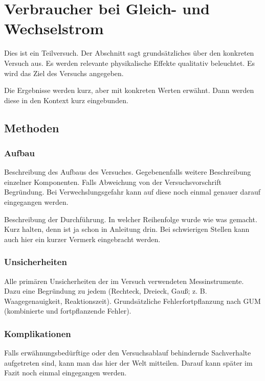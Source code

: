 \section{Verbraucher bei Gleich- und Wechselstrom} 

Dies ist ein Teilversuch.
Der Abschnitt sagt grundsätzliches über den konkreten Versuch aus.
Es werden relevante physikalische Effekte qualitativ beleuchtet.
Es wird das Ziel des Versuchs angegeben.

Die Ergebnisse werden kurz, aber mit konkreten Werten erwähnt.
Dann werden diese in den Kontext kurz eingebunden.

\subsection{Methoden}

\subsubsection{Aufbau}

Beschreibung des Aufbaus des Versuches.
Gegebenenfalls weitere Beschreibung einzelner Komponenten.
Falls Abweichung von der Versuchsvorschrift Begründung.
Bei Verwechslungsgefahr kann  auf diese noch einmal genauer darauf eingegangen werden.

Beschreibung der Durchführung.
In welcher Reihenfolge wurde wie was gemacht.
Kurz halten, denn ist ja schon in Anleitung drin.
Bei schwierigen Stellen kann auch hier ein kurzer Vermerk eingebracht werden.

\subsubsection{Unsicherheiten}

Alle primären Unsicherheiten der im Versuch verwendeten Messinstrumente.
Dazu eine Begründung zu jedem (Rechteck, Dreieck, Gauß; z. B. Waagegenauigkeit, Reaktionszeit).
Grundsätzliche Fehlerfortpflanzung nach GUM (kombinierte und fortpflanzende Fehler).

\subsubsection{Komplikationen}

Falls erwähnungsbedürftige oder den Versuchsablauf behindernde Sachverhalte aufgetreten sind, kann man das hier der Welt mitteilen.
Darauf kann später im Fazit noch einmal eingegangen werden.

